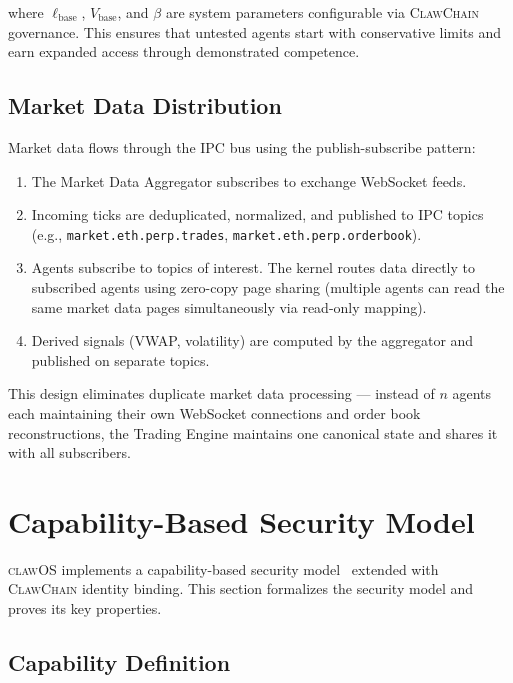 \documentclass{article}
\newcommand{\clawos}{\textsc{clawOS}}
\newcommand{\clawchain}{\textsc{ClawChain}}
\begin{document}
where $\ell_{\text{base}}$, $V_{\text{base}}$, and $\beta$ are system parameters configurable via \clawchain{} governance. This ensures that untested agents start with conservative limits and earn expanded access through demonstrated competence.

\subsection{Market Data Distribution}

Market data flows through the IPC bus using the publish-subscribe pattern:

\begin{enumerate}[leftmargin=*]
    \item The Market Data Aggregator subscribes to exchange WebSocket feeds.
    \item Incoming ticks are deduplicated, normalized, and published to IPC topics (e.g., \texttt{market.eth.perp.trades}, \texttt{market.eth.perp.orderbook}).
    \item Agents subscribe to topics of interest. The kernel routes data directly to subscribed agents using zero-copy page sharing (multiple agents can read the same market data pages simultaneously via read-only mapping).
    \item Derived signals (VWAP, volatility) are computed by the aggregator and published on separate topics.
\end{enumerate}

This design eliminates duplicate market data processing — instead of $n$ agents each maintaining their own WebSocket connections and order book reconstructions, the Trading Engine maintains one canonical state and shares it with all subscribers.

%
%

\section{Capability-Based Security Model}
\label{sec:security}

\clawos{} implements a capability-based security model~\cite{shapiro1999eros, klein2009sel4} extended with \clawchain{} identity binding. This section formalizes the security model and proves its key properties.

\subsection{Capability Definition}
\end{document}
